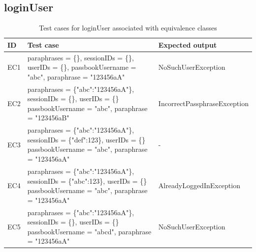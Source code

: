 \documentclass{article}
\begin{document}
\subsection{loginUser}

\begin{longtable}{|p{2cm}|p{7cm}|p{5cm}|}
\caption{Test cases for loginUser associated with equivalence classes}\\
\hline 
ID&Test case&Expected output\\
\hline  
EC1&paraphrases = \{\}, sessionIDs = \{\}, userIDs = \{\}, passbookUsername = "abc", paraphrase = "123456aA"&NoSuchUserException\\
\hline
EC2&paraphrases = \{"abc":"123456aA"\}, sessionIDs = \{\}, userIDs = \{\} passbookUsername = "abc", paraphrase = "123456aB"&IncorrectPassphraseException\\
\hline
EC3&paraphrases = \{"abc":"123456aA"\}, sessionIDs = \{"def":123\}, userIDs = \{\} passbookUsername = "abc", paraphrase = "123456aA"&-\\
\hline
EC4&paraphrases = \{"abc":"123456aA"\}, sessionIDs = \{"abc":123\}, userIDs = \{\} passbookUsername = "abc", paraphrase = "123456aA"&AlreadyLoggedInException\\
\hline
EC5&paraphrases = \{"abc":"123456aA"\}, sessionIDs = \{\}, userIDs = \{\} passbookUsername = "abcd", paraphrase = "123456aA"&NoSuchUserException\\
\hline
\end{longtable}
\end{document}
